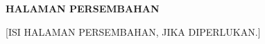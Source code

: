 \clearpage
{}
{}
\begin{center}\textbf{\large HALAMAN PERSEMBAHAN}\end{center}
\vspace{2cm}
\begin{center}[ISI HALAMAN PERSEMBAHAN, JIKA DIPERLUKAN.]\end{center}
